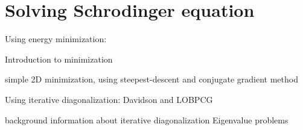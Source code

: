\section{Solving Schrodinger equation}

Using energy minimization:

Introduction to minimization

simple 2D minimization, using steepest-descent and conjugate gradient
method


Using iterative diagonalization: Davidson and LOBPCG

background information about iterative diagonalization
Eigenvalue problems
